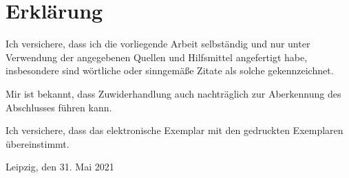\documentclass[../master.tex]{subfiles}
\begin{document}
\section*{Erklärung}
\label{sec:declaration}

Ich versichere, dass ich die vorliegende Arbeit selbständig und nur unter Verwendung der angegebenen Quellen und Hilfsmittel angefertigt habe, insbesondere sind wörtliche oder sinngemäße Zitate als solche gekennzeichnet.

\noindent
Mir ist bekannt, dass Zuwiderhandlung auch nachträglich zur Aberkennung des Abschlusses führen kann.

\noindent
Ich versichere, dass das elektronische Exemplar mit den gedruckten Exemplaren übereinstimmt.

\vspace{3cm}
\noindent
Leipzig, den 31. Mai 2021
\end{document}
